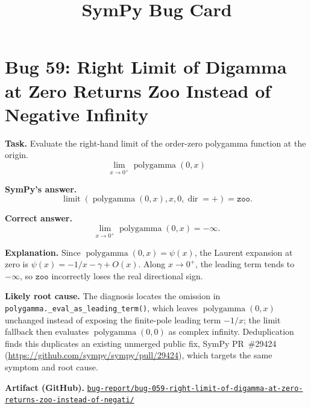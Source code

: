 \documentclass[11pt]{article}
\title{SymPy Bug Card}
\author{}
\date{}
\newcommand{\artifactrepo}{https://github.com/TODO-org/TODO-repo}
\newcommand{\bugbundle}[1]{\href{\artifactrepo/tree/main/bug-report/#1}{\nolinkurl{bug-report/#1/}}}
\begin{document}
\maketitle

\section*{Bug 59: Right Limit of Digamma at Zero Returns Zoo Instead of Negative Infinity}

\begin{counterexamplebox}
\textbf{Task.} Evaluate the right-hand limit of the order-zero polygamma function at the origin.
\[
\lim_{x \to 0^+} \operatorname{polygamma}(0,x)
\]

\medskip
\textbf{SymPy's answer.}
\[
\operatorname{limit}(\operatorname{polygamma}(0,x),x,0,\operatorname{dir}=+)=\mathtt{zoo}.
\]

\medskip
\textbf{Correct answer.}
\[
\lim_{x \to 0^+} \operatorname{polygamma}(0,x)=-\infty.
\]

\medskip
\textbf{Explanation.} Since \(\operatorname{polygamma}(0,x)=\psi(x)\), the Laurent expansion at zero is \(\psi(x)=-1/x-\gamma+O(x)\). Along \(x \to 0^+\), the leading term tends to \(-\infty\), so \(\mathtt{zoo}\) incorrectly loses the real directional sign.

\medskip
\textbf{Likely root cause.} The diagnosis locates the omission in \texttt{polygamma.\_eval\_as\_leading\_term()}, which leaves \(\operatorname{polygamma}(0,x)\) unchanged instead of exposing the finite-pole leading term \(-1/x\); the limit fallback then evaluates \(\operatorname{polygamma}(0,0)\) as complex infinity. Deduplication finds this duplicates an existing unmerged public fix, SymPy PR~\#29424 (\url{https://github.com/sympy/sympy/pull/29424}), which targets the same symptom and root cause.

\medskip
\textbf{Artifact (GitHub).} \bugbundle{bug-059-right-limit-of-digamma-at-zero-returns-zoo-instead-of-negati}
\end{counterexamplebox}
\end{document}
